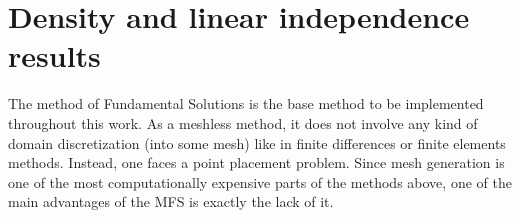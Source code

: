 \label{chap:numerical}

\section{Density and linear independence results}\label{density_proofs_section}

The method of Fundamental Solutions is the base method to be implemented throughout this work. As a meshless method, it does not involve any kind of domain discretization (into some mesh) like in finite differences or finite elements methods. Instead, one faces a point placement problem. Since mesh generation is one of the most computationally expensive parts of the methods above, one of the main advantages of the \ac{MFS} is exactly the lack of it. 


